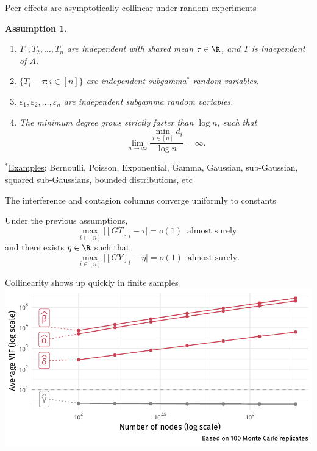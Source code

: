 \documentclass[aspectratio=169]{beamer}
\newtheorem{assumption}{Assumption}
\theoremstyle{remark}
\begin{document}
\begin{frame}{Peer effects are asymptotically collinear under random experiments}
    \begin{assumption}
        \begin{enumerate}
            \item $T_1,T_2,\dots,T_n$ are independent with shared mean $\tau \in \R$, and $T$ is independent of $A$.
            \item $\{ T_i - \tau : i \in [n] \}$ are independent subgamma$^*$ random variables.
            \item $\varepsilon_1, \varepsilon_2, \dots, \varepsilon_n$ are independent subgamma random variables.
            \item The minimum degree grows strictly faster than $\log n$, such that
                  \begin{equation*}
                      \lim_{n \to \infty} \frac{\min_{i \in [n]} d_i}{\log n} = \infty.
                  \end{equation*}
        \end{enumerate}
    \end{assumption}
    
    $^*$\underline{Examples}: Bernoulli, Poisson, Exponential, Gamma, Gaussian, sub-Gaussian, squared sub-Gaussians, bounded distributions, etc
\end{frame}

\begin{frame}{The interference and contagion columns converge uniformly to constants}
    
    \begin{theorem}
        Under the previous assumptions,
        \begin{equation*}
            \max_{i \in [n]} \Big| [GT]_i - \tau \Big|
            = o(1) ~ \text{ almost surely }
        \end{equation*}
        and there exists $\eta \in \R$ such that
        \begin{equation*}
            \max_{i \in [n]} \Big| [GY]_i - \eta \Big|
            = o(1) ~ \text{ almost surely.}
        \end{equation*}
    \end{theorem}
\end{frame}

\begin{frame}{Collinearity shows up quickly in finite samples}
    \vspace{3mm}
    \centering
    \includegraphics{./figures/simulations/defense-vif.pdf}
\end{frame}
\end{document}
